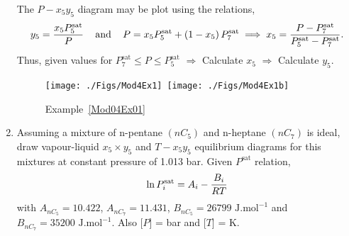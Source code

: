 \begin{enumerate}[1)]
           The $P-x_{5}y_{5}$ diagram may be plot using the relations,
           \begin{displaymath}
               y_{5} = \displaystyle\frac{x_{5}P_{5}^{\text{sat}}}{P}\;\;\;\text{ and }\;\;\; P = x_{5}P_{5}^{\text{sat}} + \left(1-x_{5}\right)P_{7}^{\text{sat}} \;\Longrightarrow\; x_{5} = \displaystyle\frac{P-P_{7}^{\text{sat}}}{P_{5}^{\text{sat}}-P_{7}^{\text{sat}}}.
           \end{displaymath}
           Thus, given values for $P_{7}^{\text{sat}}\leq P \leq P_{5}^{\text{sat}}$ $\Rightarrow$ Calculate $x_{5}$  $\Rightarrow$ Calculate $y_{5}$.
           
      \begin{figure}[h]
         \vbox{
             \hbox{\texttt{[image: ./Figs/Mod4Ex1]}
                   \texttt{[image: ./Figs/Mod4Ex1b]}}}
         \caption{Example~\ref{Mod04Ex01}}
      \end{figure}
\clearpage
   \item\label{Mod04Ex02} Assuming a mixture of n-pentane $\left(nC_{5}\right)$ and n-heptane $\left(nC_{7}\right)$ is ideal, draw vapour-liquid $x_{5}\times y_{5}$ and $T-x_{5}y_{5}$ equilibrium diagrams for this mixtures at constant pressure of 1.013 bar. Given $P^{\text{sat}}$ relation,
    \begin{displaymath}
      \ln{P_{i}^{\text{sat}}} = A_{i} - \displaystyle\frac{B_{i}}{RT}
    \end{displaymath}
    with $A_{nC_{5}}=10.422$, $A_{nC_{7}}=11.431$, $B_{nC_{5}}=26799 \text{ J.mol}^{-1}$ and $B_{nC_{7}}=35200 \text{ J.mol}^{-1}$. Also [$P$] = bar and [$T$] = K.


\end{enumerate}
